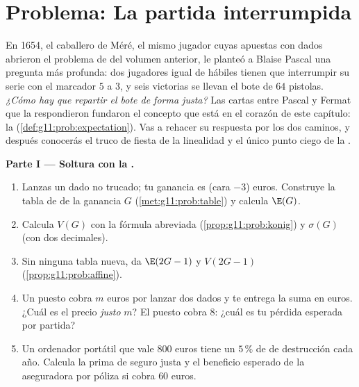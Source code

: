 \section{Problema: La partida interrumpida}

\begin{problem}
\label{pb:g11:prob:1}
En 1654, el caballero de Méré, el mismo jugador cuyas apuestas con dados
abrieron el problema de  del volumen anterior, le planteó a
Blaise Pascal una pregunta más profunda: dos jugadores igual de hábiles
tienen que interrumpir su serie con el marcador $5$ a $3$, y seis
victorias se llevan el bote de $64$ pistolas. \emph{¿Cómo hay que repartir
el bote de forma justa?} Las cartas entre Pascal y Fermat que la
respondieron fundaron el concepto que está en el corazón de este capítulo:
la  (\cref{def:g11:prob:expectation}). Vas a rehacer su respuesta
por los dos caminos, y después conocerás el truco de fiesta de la
linealidad y el único punto ciego de la .

\medskip
\noindent\textbf{Parte I --- Soltura con la .}
\begin{enumerate}
  \item Lanzas un dado no trucado; tu ganancia es (cara $- 3$) euros.
        Construye la tabla de  de la ganancia $G$
        (\cref{met:g11:prob:table}) y calcula $\E(G)$.
  \item Calcula $V(G)$ con la fórmula abreviada
        (\cref{prop:g11:prob:konig}) y $\sigma(G)$ (con dos decimales).
  \item Sin ninguna tabla nueva, da $\E(2G - 1)$ y $V(2G - 1)$
        (\cref{prop:g11:prob:affine}).
  \item Un puesto cobra $m$ euros por lanzar dos dados y te entrega la
        suma en euros. ¿Cuál es el precio \emph{justo} $m$? El puesto
        cobra $8$: ¿cuál es tu pérdida esperada por partida?
  \item Un ordenador portátil que vale $800$ euros tiene un $5\,\%$ de
         de destrucción cada año. Calcula la prima de seguro
        justa y el beneficio esperado de la aseguradora por póliza si
        cobra $60$ euros.
\end{enumerate}


\end{problem}
